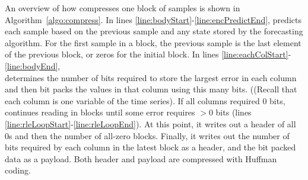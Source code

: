 \newcommand{\err}{\texttt{err}}
\newcommand{\nbits}{\texttt{nbits}}
\newcommand{\packed}{\texttt{packed}}
\newcommand{\buff}{$\texttt{buff}$}
\newcommand{\bytes}{\texttt{bytes}}
\newcommand{\payload}{\texttt{payload}}
\newcommand{\f}{\texttt{f}}
\newcommand{\fore}{\texttt{forecaster}}
\newcommand{\self}{\texttt{self}}


An overview of how \minesp compresses one block of samples is shown in Algorithm~\ref{algo:compress}. In lines \ref{line:bodyStart}-\ref{line:encPredictEnd}, \minesp predicts each sample based on the previous sample and any state stored by the forecasting algorithm. For the first sample in a block, the previous sample is the last element of the previous block, or zeros for the initial block. In lines \ref{line:eachColStart}-\ref{line:bodyEnd}, \minesp \\ determines the number of bits required to store the largest error in each column and then bit packs the values in that column using this many bits. ((Recall that each column is one variable of the time series). If all columns required 0 bits, \minesp continues reading in blocks until some error requires $>$0 bits (lines \ref{line:rleLoopStart}-\ref{line:rleLoopEnd}). At this point, it writes out a header of all 0s and then the number of all-zero blocks. Finally, it writes out the number of bits required by each column in the latest block as a header, and the bit packed data as a payload. Both header and payload are compressed with Huffman coding.

